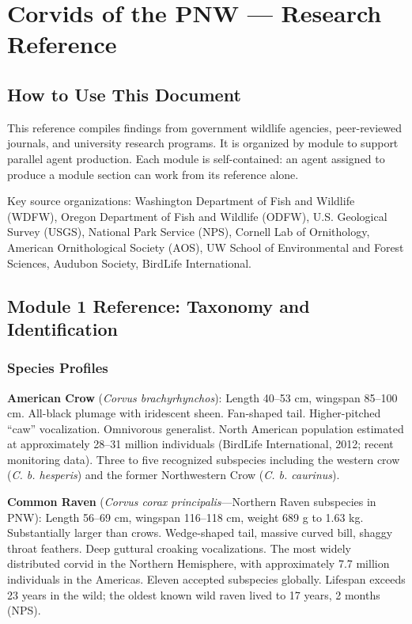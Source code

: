 \documentclass[11pt,letterpaper]{article}
\newcommand{\stageheader}[2]{%
  \noindent\colorbox{#2}{\makebox[\textwidth][l]{%
    \textcolor{white}{\bfseries\sffamily\hspace{6pt}#1\hspace{6pt}}}}%
  \vspace{0.5em}\par%
}
\begin{document}
\newpage

\stageheader{STAGE 2 --- RESEARCH REFERENCE}{secondary}

\section{Corvids of the PNW --- Research Reference}

\subsection{How to Use This Document}

This reference compiles findings from government wildlife agencies, peer-reviewed journals, and university research programs. It is organized by module to support parallel agent production. Each module is self-contained: an agent assigned to produce a module section can work from its reference alone.

Key source organizations: Washington Department of Fish and Wildlife (WDFW), Oregon Department of Fish and Wildlife (ODFW), U.S. Geological Survey (USGS), National Park Service (NPS), Cornell Lab of Ornithology, American Ornithological Society (AOS), UW School of Environmental and Forest Sciences, Audubon Society, BirdLife International.

\subsection{Module 1 Reference: Taxonomy and Identification}

\subsubsection{Species Profiles}

\textbf{American Crow} (\textit{Corvus brachyrhynchos}): Length 40--53 cm, wingspan 85--100 cm. All-black plumage with iridescent sheen. Fan-shaped tail. Higher-pitched ``caw'' vocalization. Omnivorous generalist. North American population estimated at approximately 28--31 million individuals (BirdLife International, 2012; recent monitoring data). Three to five recognized subspecies including the western crow (\textit{C. b. hesperis}) and the former Northwestern Crow (\textit{C. b. caurinus}).

\textbf{Common Raven} (\textit{Corvus corax principalis}---Northern Raven subspecies in PNW): Length 56--69 cm, wingspan 116--118 cm, weight 689 g to 1.63 kg. Substantially larger than crows. Wedge-shaped tail, massive curved bill, shaggy throat feathers. Deep guttural croaking vocalizations. The most widely distributed corvid in the Northern Hemisphere, with approximately 7.7 million individuals in the Americas. Eleven accepted subspecies globally. Lifespan exceeds 23 years in the wild; the oldest known wild raven lived to 17 years, 2 months (NPS).
\end{document}
